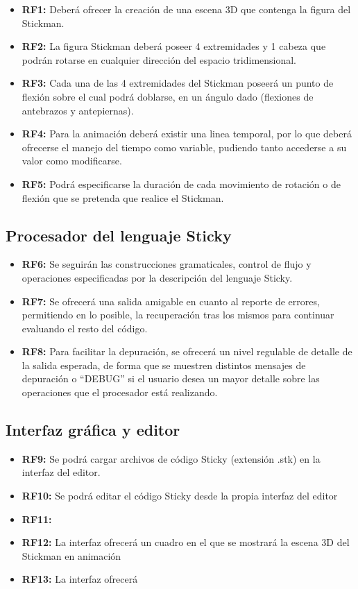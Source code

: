\documentclass[11pt,a4paper]{report}
\begin{document}
\begin{itemize}
\item \textbf{RF1:} Deberá ofrecer la creación de una escena 3D que contenga la figura del Stickman.
\item \textbf{RF2:} La figura Stickman deberá poseer 4 extremidades y 1 cabeza que podrán rotarse en cualquier dirección del espacio tridimensional.
\item \textbf{RF3:} Cada una de las 4 extremidades del Stickman poseerá un punto de flexión sobre el cual podrá doblarse, en un ángulo dado (flexiones de antebrazos y antepiernas).
\item \textbf{RF4:} Para la animación deberá existir una linea temporal, por lo que deberá ofrecerse el manejo del tiempo como variable, pudiendo tanto accederse a su valor como modificarse.
\item \textbf{RF5:} Podrá especificarse la duración de cada movimiento de rotación o de flexión que se pretenda que realice el Stickman.
\end{itemize}
\subsection{Procesador del lenguaje Sticky}
\label{sec-1.2.2}


\begin{itemize}
\item \textbf{RF6:} Se seguirán las construcciones gramaticales, control de flujo y operaciones especificadas por la descripción del lenguaje Sticky.
\item \textbf{RF7:} Se ofrecerá una salida amigable en cuanto al reporte de errores, permitiendo en lo posible, la recuperación tras los mismos para continuar evaluando el resto del código.
\item \textbf{RF8:} Para facilitar la depuración, se ofrecerá un nivel regulable de detalle de la salida esperada, de forma que se muestren distintos mensajes de depuración o ``DEBUG'' si el usuario desea un mayor detalle sobre las operaciones que el procesador está realizando.
\end{itemize}
\subsection{Interfaz gráfica y editor}
\label{sec-1.2.3}


\begin{itemize}
\item \textbf{RF9:} Se podrá cargar archivos de código Sticky (extensión .stk) en la interfaz del editor.
\item \textbf{RF10:} Se podrá editar el código Sticky desde la propia interfaz del editor
\item \textbf{RF11:}
\item \textbf{RF12:} La interfaz ofrecerá un cuadro en el que se mostrará la escena 3D del Stickman en animación
\item \textbf{RF13:} La interfaz ofrecerá
\end{itemize}
\end{document}
